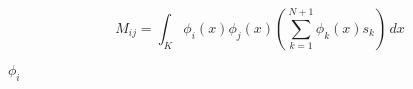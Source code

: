 \documentclass{article}
\begin{document}
\[ M_{ij} = \int_{K} \phi_i(x) \phi_j(x) (\sum_{k=1}^{N+1} \phi_k(x) s_k) \, dx \]
\pagebreak

$ \phi_i $
\pagebreak
\end{document}

